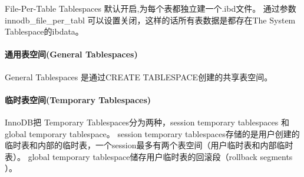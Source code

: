 \documentclass[../../../interview-questions.tex]{subfiles}
\begin{document}
File-Per-Table Tablespaces 默认开启,为每个表都独立建一个.ibd文件。 通过参数innodb\_file\_per\_tabl 可以设置关闭，这样的话所有表数据是都存在The System Tablespace的ibdata。

\paragraph{通用表空间(General Tablespaces)}

General Tablespaces 是通过CREATE TABLESPACE创建的共享表空间。


\paragraph{临时表空间(Temporary Tablespaces)}

InnoDB把 Temporary Tablespaces分为两种，session temporary tablespaces 和global temporary tablespace。
session temporary tablespaces存储的是用户创建的临时表和内部的临时表，一个session最多有两个表空间（用户临时表和内部临时表）。
global temporary tablespace储存用户临时表的回滚段（rollback segments ）。
\end{document}
